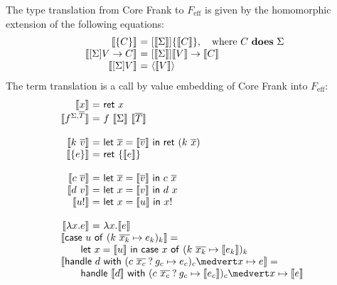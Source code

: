 \documentclass[preprint]{sigplanconf}
\makeatletter
\newcommand{\feff}{$F_\textrm{eff}$\xspace}
\newcommand{\set}[1]{\{#1\}}
\newcommand{\many}{\overline}
\newcommand{\sem}[1]{\llbracket{#1}\rrbracket}
\newcommand{\seml}{\left\llbracket}
\newcommand{\semr}{\right\rrbracket}
\newcommand{\dom}{\mathit{dom}}
\newcommand\ba{\begin{array}}
\newcommand\ea{\end{array}}
\newcommand{\bl}{\ba{@{}c@{}}}
\newcommand{\el}{\ea}
\newenvironment{equations}{\[\ba{@{}r@{~}c@{~}l@{}}}{\ea\]}
\newcommand{\judgeword}[1]{~\mathbf{#1}~}
\newcommand{\sigentails}[1]{\mathbin{[{\text{\scriptsize ${#1}$}}]\!\text{-\!-}}\,}
\newcommand{\rt}[1]{\langle{#1}\rangle}   %
\newcommand{\makes}[4]  {#1 \sigentails{#2} {#3} \judgeword{is} {#4}}
\newcommand{\effs}[2]{{#1} \judgeword{does} {#2}}
\newcommand{\makesgs}{\makes{\Gamma}{\sigs}}
\newcommand{\sigs}{\Sigma}
\newcommand{\effbox}[1]{[#1]}
\newcommand{\key}[1]{\mathsf{#1}}
\newcommand{\handleSymbol}{\mathbin{?}}
\newcommand{\handle}[2]{{#1} \handleSymbol {#2}}
\newcommand{\thunk}[1]{\{{#1}\}}
\newcommand{\force}[1]{{#1}!}
\makeatother
\begin{document}
The type translation from Core Frank to \feff is given by the
homomorphic extension of the following equations:
\begin{equations}
\sem{\thunk{C}} &=& \effbox{\sem{\sigs}}\thunk{\sem{C}}, \quad \text{where }\effs{C}{\sigs} \\
\sem{\effbox{\sigs}V \to C} &=& \effbox{\sem{\sigs}}\sem{V} \to \sem{C} \\
\sem{\effbox{\sigs}V} &=& \rt{\sem{V}}\\
\end{equations}%
%
%
The term translation is a call by value embedding of Core Frank into
\feff:
%
\begin{equations}
\sem{x} &=& \key{ret}~x \\
\sem{f^{\sigs, \many{T}}} &=& f~\sem{\sigs}~\sem{\many{T}} \\
\\
\sem{k~\many{v}} &=& \key{let}~\many{x}=\sem{\many{v}} ~\key{in}~\key{ret}~(k~\many{x}) \\
\sem{\thunk{e}} &=& \key{ret}~\thunk{\sem{e}} \\
\\
\sem{c~\many{v}} &=& \key{let}~\many{x}=\sem{\many{v}} ~\key{in}~c~\many{x} \\
\sem{d~v} &=& \key{let}~x=\sem{v} ~\key{in}~d~x \\
\sem{\force{u}} &=& \key{let}~x=\sem{u} ~\key{in}~\force{x} \\
\\
\sem{\lambda x.e} &=& \lambda x.\sem{e} \\
\multicolumn{3}{@{}l}{\sem{\key{case}~u~\key{of}~(k~\many{x_k} \mapsto e_k)_k} =} \\
\multicolumn{3}{@{}l}
  {\qquad \key{let}~x=\sem{u} ~\key{in}~
    \key{case}~x~\key{of}~(k~\many{x_k} \mapsto \sem{e_k})_k} \\
\multicolumn{3}{@{}l}{\sem{\key{handle}~d~\key{with}~(\handle{c~\many{x_c}}{g_c} \mapsto e_c)_c \medvert x \mapsto e} =} \\
\multicolumn{3}{@{}l}
  {\qquad \key{handle}~\sem{d}~\key{with}~ 
            (\handle{c~\many{x_c}}{g_c} \mapsto \sem{e_c})_c
            \medvert x \mapsto \sem{e}} \\
\end{equations}%
\end{document}
